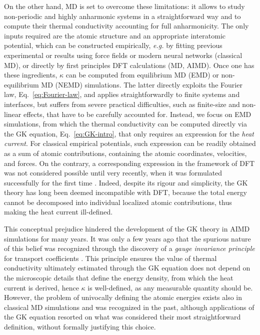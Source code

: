 On the other hand, MD is set to overcome these limitations: it allows to study non-periodic and highly anharmonic systems in a straightforward way and to compute their thermal conductivity accounting for full anharmonicity. The only inputs required are the atomic structure and an appropriate interatomic potential, which can be constructed empirically, \emph{e.g.} by fitting previous experimental or \abinitio results using force fields or modern neural networks (classical MD), or directly by first principles DFT calculations (\abinitio MD, AIMD). 
Once one has these ingredients, $\kappa$ can be computed from equilibrium MD (EMD) or non-equilibrium MD (NEMD) simulations. The latter directly exploits the Fourier law, Eq.~\eqref{eq:Fourier-law}, and applies straightforwardly to finite systems and interfaces, but suffers from severe practical difficulties, such as finite-size and non-linear effects, that have to be carefully accounted for. 
Instead, we focus on EMD simulations, from which the thermal conductivity can be computed directly via the GK equation, Eq.~\eqref{eq:GK-intro}, that only requires an expression for the \emph{heat current}. 
For classical empirical potentials, such expression can be readily obtained as a sum of atomic contributions, containing the atomic coordinates, velocities, and forces. 
On the contrary, a corresponding expression in the framework of DFT was not considered possible until very recently, when it was formulated successfully for the first time \cite{Marcolongo2016}.
Indeed, despite its rigour and simplicity, the GK theory has long been deemed incompatible with DFT, because the total energy cannot be decomposed into individual localized atomic contributions, thus making the heat current ill-defined. 

This conceptual prejudice hindered the development of the GK theory in AIMD simulations for many years. It was only a few years ago that the spurious nature of this belief was recognized through the discovery of a \emph{gauge invariance principle} for transport coefficients \cite{Marcolongo2016,Ercole2016}. 
This principle ensures the value of thermal conductivity ultimately estimated through the GK equation does not depend on the microscopic details that define the energy density, from which the heat current is derived, hence $\kappa$ is well-defined, as any measurable quantity should be. 
However, the problem of univocally defining the atomic energies exists also in classical MD simulations and was recognized in the past, although applications of the GK equation resorted on what was considered their most straightforward definition, without formally justifying this choice. 

